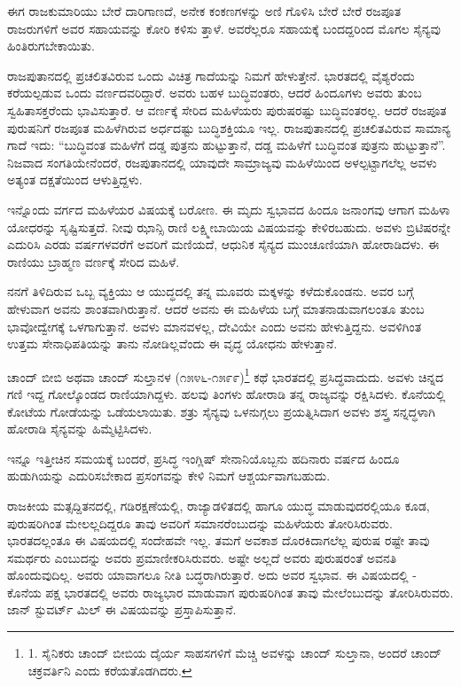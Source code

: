 ಈಗ ರಾಜಕುಮಾರಿಯು ಬೇರೆ ದಾರಿಗಾಣದೆ, ಅನೇಕ ಕಂಕಣಗಳನ್ನು ಅಣಿ ಗೊಳಿಸಿ ಬೇರೆ ಬೇರೆ ರಜಪೂತ ರಾಜರುಗಳಿಗೆ ಅವರ ಸಹಾಯವನ್ನು ಕೋರಿ ಕಳಿಸು ತ್ತಾಳೆ. ಅವರೆಲ್ಲರೂ ಸಹಾಯಕ್ಕೆ ಬಂದದ್ದರಿಂದ ಮೊಗಲ ಸೈನ್ಯವು ಹಿಂತಿರುಗಬೇಕಾಯಿತು.

ರಾಜಪುತಾನದಲ್ಲಿ ಪ್ರಚಲಿತವಿರುವ ಒಂದು ವಿಚಿತ್ರ ಗಾದೆಯನ್ನು ನಿಮಗೆ ಹೇಳುತ್ತೇನೆ. ಭಾರತದಲ್ಲಿ ವೈಶ್ಯರೆಂದು ಕರೆಯಲ್ಪಡುವ ಒಂದು ವರ್ಣದವರಿದ್ದಾರೆ. ಅವರು ಬಹಳ ಬುದ್ಧಿವಂತರು, ಆದರೆ ಹಿಂದೂಗಳು ಅವರು ತುಂಬ ಸ್ವಹಿತಾಸಕ್ತರೆಂದು ಭಾವಿಸುತ್ತಾರೆ. ಆ ವರ್ಣಕ್ಕೆ ಸೇರಿದ ಮಹಿಳೆಯರು ಪುರುಷರಷ್ಟು ಬುದ್ಧಿವಂತರಲ್ಲ. ಆದರೆ ರಜಪೂತ ಪುರುಷನಿಗೆ ರಜಪೂತ ಮಹಿಳೆಗಿರುವ ಅರ್ಧದಷ್ಟು ಬುದ್ಧಿಶಕ್ತಿಯೂ ಇಲ್ಲ. ರಾಜಪುತಾನದಲ್ಲಿ ಪ್ರಚಲಿತವಿರುವ ಸಾಮಾನ್ಯ ಗಾದೆ ಇದು: “ಬುದ್ಧಿವಂತ ಮಹಿಳೆಗೆ ದಡ್ಡ ಪುತ್ರನು ಹುಟ್ಟುತ್ತಾನೆ, ದಡ್ಡ ಮಹಿಳೆಗೆ ಬುದ್ಧಿವಂತ ಪುತ್ರನು ಹುಟ್ಟುತ್ತಾನೆ”. ನಿಜವಾದ ಸಂಗತಿಯೇನೆಂದರೆ, ರಜಪುತಾನದಲ್ಲಿ ಯಾವುದೇ ಸಾಮ್ರಾಜ್ಯವು ಮಹಿಳೆಯಿಂದ ಅಳಲ್ಪಟ್ಟಾಗಲೆಲ್ಲ ಅವಳು ಅತ್ಯಂತ ದಕ್ಷತೆಯಿಂದ ಆಳುತ್ತಿದ್ದಳು.

ಇನ್ನೊಂದು ವರ್ಗದ ಮಹಿಳೆಯರ ವಿಷಯಕ್ಕೆ ಬರೋಣ. ಈ ಮೃದು ಸ್ವಭಾವದ ಹಿಂದೂ ಜನಾಂಗವು ಆಗಾಗ ಮಹಿಳಾ ಯೋಧರನ್ನು ಸೃಷ್ಟಿಸುತ್ತದೆ. ನೀವು ಝಾನ್ಸಿ ರಾಣಿ ಲಕ್ಷ್ಮೀಬಾಯಿಯ ವಿಷಯವನ್ನು ಕೇಳಿರಬಹುದು. ಅವಳು ಬ್ರಿಟಿಷರನ್ನೇ ಎದುರಿಸಿ ಎರಡು ವರ್ಷಗಳವರೆಗೆ ಅವರಿಗೆ ಮಣಿಯದೆ, ಆಧುನಿಕ ಸೈನ್ಯದ ಮುಂಚೂಣಿಯಾಗಿ ಹೋರಾಡಿದಳು. ಈ ರಾಣಿಯು ಬ್ರಾಹ್ಮಣ ವರ್ಣಕ್ಕೆ ಸೇರಿದ ಮಹಿಳೆ.

ನನಗೆ ತಿಳಿದಿರುವ ಒಬ್ಬ ವ್ಯಕ್ತಿಯು ಆ ಯುದ್ಧದಲ್ಲಿ ತನ್ನ ಮೂವರು ಮಕ್ಕಳನ್ನು ಕಳೆದುಕೊಂಡನು. ಅವರ ಬಗ್ಗೆ ಹೇಳುವಾಗ ಅವನು ಶಾಂತವಾಗಿರುತ್ತಾನೆ. ಆದರೆ ಅವನು ಈ ಮಹಿಳೆಯ ಬಗ್ಗೆ ಮಾತನಾಡುವಾಗಲಂತೂ ತುಂಬ ಭಾವೋದ್ವೇಗಕ್ಕೆ ಒಳಗಾಗುತ್ತಾನೆ. ಅವಳು ಮಾನವಳಲ್ಲ, ದೇವಿಯೇ ಎಂದು ಅವನು ಹೇಳುತ್ತಿದ್ದನು. ಅವಳಿಗಿಂತ ಉತ್ತಮ ಸೇನಾಧಿಪತಿಯನ್ನು ತಾನು ನೋಡಿಲ್ಲವೆಂದು ಈ ವೃದ್ಧ ಯೋಧನು ಹೇಳುತ್ತಾನೆ.

ಚಾಂದ್ ಬೀಬಿ ಅಥವಾ ಚಾಂದ್ ಸುಲ್ತಾನಳ (೧೫೪೬-೧೫೯೯)\footnote{1. ಸೈನಿಕರು ಚಾಂದ್ ಬೀಬಿಯ ದೈರ್ಯ ಸಾಹಸಗಳಿಗೆ ಮೆಚ್ಚಿ ಅವಳನ್ನು ಚಾಂದ್ ಸುಲ್ತಾನಾ, ಅಂದರೆ ಚಾಂದ್ ಚಕ್ರವರ್ತಿನಿ ಎಂದು ಕರೆಯತೊಡಗಿದರು.} ಕಥೆ ಭಾರತದಲ್ಲಿ ಪ್ರಸಿದ್ಧವಾದುದು. ಅವಳು ಚಿನ್ನದ ಗಣಿ ಇದ್ದ ಗೋಲ್ಕೊಂಡದ ರಾಣಿಯಾಗಿದ್ದಳು. ಹಲವು ತಿಂಗಳು ಹೋರಾಡಿ ತನ್ನ ರಾಜ್ಯವನ್ನು ರಕ್ಷಿಸಿದಳು. ಕೊನೆಯಲ್ಲಿ ಕೋಟೆಯ ಗೋಡೆಯನ್ನು ಒಡೆಯಲಾಯಿತು. ಶತ್ರು ಸೈನ್ಯವು ಒಳನುಗ್ಗಲು ಪ್ರಯತ್ನಿಸಿದಾಗ ಅವಳು ಶಸ್ತ್ರ ಸನ್ನದ್ಧಳಾಗಿ ಹೋರಾಡಿ ಸೈನ್ಯವನ್ನು ಹಿಮ್ಮೆಟ್ಟಿಸಿದಳು.

ಇನ್ನೂ ಇತ್ತೀಚಿನ ಸಮಯಕ್ಕೆ ಬಂದರೆ, ಪ್ರಸಿದ್ಧ ಇಂಗ್ಲಿಷ್ ಸೇನಾನಿಯೊಬ್ಬನು ಹದಿನಾರು ವರ್ಷದ ಹಿಂದೂ ಹುಡುಗಿಯನ್ನು ಎದುರಿಸಬೇಕಾದ ಪ್ರಸಂಗವನ್ನು ಕೇಳಿ ನಿಮಗೆ ಆಶ್ಚರ್ಯವಾಗಬಹುದು.

ರಾಜಕೀಯ ಮತ್ಸದ್ದಿತನದಲ್ಲಿ, ಗಡಿರಕ್ಷಣೆಯಲ್ಲಿ, ರಾಜ್ಯಾಡಳಿತದಲ್ಲಿ ಹಾಗೂ ಯುದ್ಧ ಮಾಡುವುದರಲ್ಲಿಯೂ ಕೂಡ, ಪುರುಷರಿಗಿಂತ ಮೇಲಲ್ಲದಿದ್ದರೂ ತಾವು ಅವರಿಗೆ ಸಮಾನರೆಂಬುದನ್ನು ಮಹಿಳೆಯರು ತೋರಿಸಿರುವರು. ಭಾರತದಲ್ಲಂತೂ ಈ ವಿಷಯದಲ್ಲಿ ಸಂದೇಹವೇ ಇಲ್ಲ. ತಮಗೆ ಅವಕಾಶ ದೊರಕಿದಾಗಲೆಲ್ಲ ಪುರುಷ ರಷ್ಟೇ ತಾವು ಸಮರ್ಥರು ಎಂಬುದನ್ನು ಅವರು ಪ್ರಮಾಣೀಕರಿಸಿರುವರು. ಅಷ್ಟೇ ಅಲ್ಲದೆ ಅವರು ಪುರುಷರಂತೆ ಅವನತಿ ಹೊಂದುವುದಿಲ್ಲ. ಅವರು ಯಾವಾಗಲೂ ನೀತಿ ಬದ್ಧರಾಗಿರುತ್ತಾರೆ. ಅದು ಅವರ ಸ್ವಭಾವ. ಈ ವಿಷಯದಲ್ಲಿ - ಕೊನೆಯ ಪಕ್ಷ ಭಾರತದಲ್ಲಿ ಅವರು ರಾಜ್ಯಭಾರ ಮಾಡುವಾಗ ಪುರುಷರಿಗಿಂತ ತಾವು ಮೇಲೆಂಬುದನ್ನು ತೋರಿಸಿರುವರು. ಜಾನ್ ಸ್ಟುವರ್ಟ್ ಮಿಲ್ ಈ ವಿಷಯವನ್ನು ಪ್ರಸ್ತಾಪಿಸುತ್ತಾನೆ.

